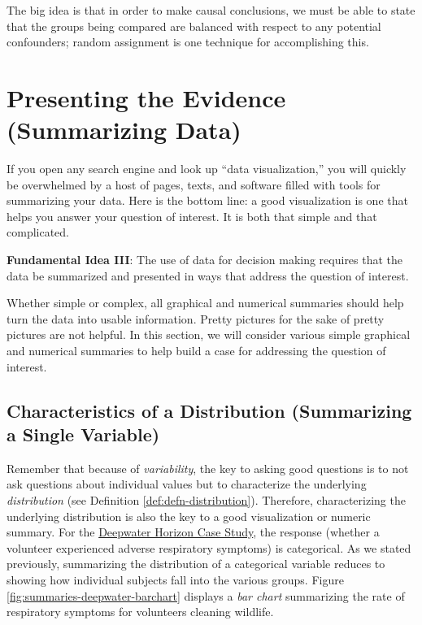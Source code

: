 \documentclass[]{book}
\theoremstyle{plain}
\theoremstyle{mydefn}
\theoremstyle{myexmpl}
\theoremstyle{remark}
\let\BeginKnitrBlock\begin \let\EndKnitrBlock\end
\let\BeginKnitrBlock\begin \let\EndKnitrBlock\end
\begin{document}
The big idea is that in order to make causal conclusions, we must be
able to state that the groups being compared are balanced with respect
to any potential confounders; random assignment is one technique for
accomplishing this.

\chapter{Presenting the Evidence (Summarizing Data)}\label{Summaries}

If you open any search engine and look up ``data visualization,'' you
will quickly be overwhelmed by a host of pages, texts, and software
filled with tools for summarizing your data. Here is the bottom line: a
good visualization is one that helps you answer your question of
interest. It is both that simple and that complicated.

\BeginKnitrBlock{rmdfivefund}
\textbf{Fundamental Idea III}: The use of data for decision making
requires that the data be summarized and presented in ways that address
the question of interest.
\EndKnitrBlock{rmdfivefund}

Whether simple or complex, all graphical and numerical summaries should
help turn the data into usable information. Pretty pictures for the sake
of pretty pictures are not helpful. In this section, we will consider
various simple graphical and numerical summaries to help build a case
for addressing the question of interest.

\section{Characteristics of a Distribution (Summarizing a Single
Variable)}\label{characteristics-of-a-distribution-summarizing-a-single-variable}

Remember that because of \emph{variability}, the key to asking good
questions is to not ask questions about individual values but to
characterize the underlying \emph{distribution} (see Definition
\ref{def:defn-distribution}). Therefore, characterizing the underlying
distribution is also the key to a good visualization or numeric summary.
For the \protect\hyperlink{CaseDeepwater}{Deepwater Horizon Case Study},
the response (whether a volunteer experienced adverse respiratory
symptoms) is categorical. As we stated previously, summarizing the
distribution of a categorical variable reduces to showing how individual
subjects fall into the various groups. Figure
\ref{fig:summaries-deepwater-barchart} displays a \emph{bar chart}
summarizing the rate of respiratory symptoms for volunteers cleaning
wildlife.
\end{document}
